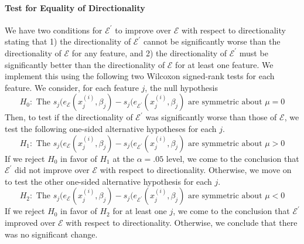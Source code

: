 \documentclass[mnsc,blindrev]{informs3}
\newcommand{\mE}{\mathcal{E}}
\begin{document}
            \paragraph{Test for Equality of Directionality}        We have two conditions for $\mE^\prime$ to improve over $\mE$ with respect to directionality stating that 1) the directionality of $\mE^\prime$ cannot be significantly worse than the directionality of $\mE$ for any feature, and 2) the directionality of $\mE^\prime$ must be significantly better than the directionality of $\mE$ for at least one feature. We implement this using the following two Wilcoxon signed-rank tests for each feature. We consider, for each feature $j$, the null hypothesis
            \begin{equation*}
                H_0: \text{ The } s_j(e_\mE(x_j^{(i)},\beta_j) - s_j(e_{\mE^\prime}(x_j^{(i)},\beta_j) \text{ are symmetric about } \mu = 0
            \end{equation*}
            Then, to test if the directionality of $\mE^\prime$ was significantly worse than those of $\mE$, we test the following one-sided alternative hypotheses for each $j$.
            \begin{equation*}
                H_1: \text{ The } s_j(e_\mE(x_j^{(i)},\beta_j) - s_j(e_{\mE^\prime}(x_j^{(i)},\beta_j) \text{ are symmetric about } \mu > 0
            \end{equation*}
            If we reject $H_0$ in favor of $H_1$ at the $\alpha=.05$ level, we come to the conclusion that $\mE^{\prime}$ did not improve over $\mE$ with respect to directionality. Otherwise, we move on to test the other one-sided alternative hypothesis for each $j$.
            \begin{equation*}
                H_2: \text{ The }  s_j(e_\mE(x_j^{(i)},\beta_j) - s_j(e_{\mE^\prime}(x_j^{(i)},\beta_j) \text{ are symmetric about } \mu < 0
            \end{equation*}
            If we reject $H_0$ in favor of $H_2$ for at least one $j$, we come to the conclusion that $\mE^{\prime}$ improved over $\mE$ with respect to directionality. Otherwise, we conclude that there was no significant change. 
            
\end{document}
